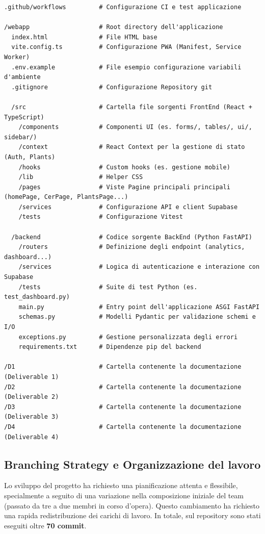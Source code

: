\begin{verbatim}
.github/workflows         # Configurazione CI e test applicazione

/webapp                   # Root directory dell'applicazione
  index.html              # File HTML base
  vite.config.ts          # Configurazione PWA (Manifest, Service Worker)
  .env.example            # File esempio configurazione variabili d'ambiente
  .gitignore              # Configurazione Repository git
  
  /src                    # Cartella file sorgenti FrontEnd (React + TypeScript)
    /components           # Componenti UI (es. forms/, tables/, ui/, sidebar/)
    /context              # React Context per la gestione di stato (Auth, Plants)
    /hooks                # Custom hooks (es. gestione mobile)
    /lib                  # Helper CSS
    /pages                # Viste Pagine principali principali (homePage, CerPage, PlantsPage...)
    /services             # Configurazione API e client Supabase
    /tests                # Configurazione Vitest
    
  /backend                # Codice sorgente BackEnd (Python FastAPI)
    /routers              # Definizione degli endpoint (analytics, dashboard...)
    /services             # Logica di autenticazione e interazione con Supabase
    /tests                # Suite di test Python (es. test_dashboard.py)
    main.py               # Entry point dell'applicazione ASGI FastAPI
    schemas.py            # Modelli Pydantic per validazione schemi e I/O
    exceptions.py         # Gestione personalizzata degli errori
    requirements.txt      # Dipendenze pip del backend
    
/D1                       # Cartella contenente la documentazione (Deliverable 1)
/D2                       # Cartella contenente la documentazione (Deliverable 2)
/D3                       # Cartella contenente la documentazione (Deliverable 3)
/D4                       # Cartella contenente la documentazione (Deliverable 4)
\end{verbatim}

\subsection{Branching Strategy e Organizzazione del lavoro}
Lo sviluppo del progetto ha richiesto una pianificazione attenta e flessibile, specialmente a seguito di una variazione nella composizione iniziale del team (passato da tre a due membri in corso d'opera). Questo cambiamento ha richiesto una rapida redistribuzione dei carichi di lavoro. In totale, sul repository sono stati eseguiti oltre \textbf{70 commit}. 

